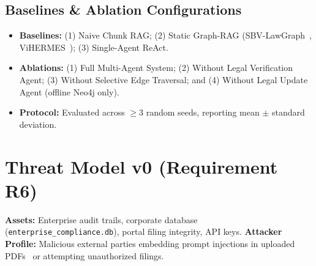 \documentclass[10pt,a4paper]{article}
\begin{document}
\subsection{Baselines \& Ablation Configurations}
\begin{itemize}[leftmargin=11pt]
  \item \textbf{Baselines:} (1) Naive Chunk RAG; (2) Static Graph-RAG (SBV-LawGraph~\cite{phan2026sbvlawgraph}, ViHERMES~\cite{vihermes2024}); (3) Single-Agent ReAct.
  \item \textbf{Ablations:} (1) Full Multi-Agent System; (2) Without Legal Verification Agent; (3) Without Selective Edge Traversal; and (4) Without Legal Update Agent (offline Neo4j only).
  \item \textbf{Protocol:} Evaluated across $\ge 3$ random seeds, reporting mean $\pm$ standard deviation.
\end{itemize}

\section{Threat Model v0 (Requirement R6)}

\textbf{Assets:} Enterprise audit trails, corporate database (\texttt{enterprise\_compliance.db}), portal filing integrity, API keys.  
\textbf{Attacker Profile:} Malicious external parties embedding prompt injections in uploaded PDFs~\cite{debenedetti2024injection} or attempting unauthorized filings.
\end{document}

